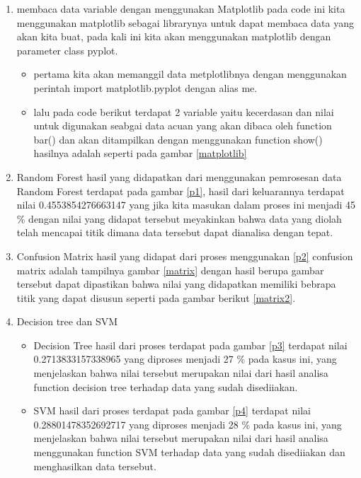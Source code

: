 \begin{enumerate}
\item membaca data variable dengan menggunakan Matplotlib 
\subitem 
pada code ini kita menggunakan matplotlib sebagai librarynya untuk dapat membaca data yang akan kita buat, pada kali ini kita akan menggunakan matplotlib dengan parameter class pyplot.
\begin{itemize}
\item pertama kita akan memanggil data metplotlibnya dengan menggunakan perintah import matplotlib.pyplot dengan alias me.
\item lalu pada code berikut terdapat 2 variable yaitu kecerdasan dan nilai untuk digunakan seabgai data acuan yang akan dibaca oleh function bar() dan akan ditampilkan dengan menggunakan function show() hasilnya adalah seperti pada gambar \ref{matplotlib}
\end{itemize}

\item Random Forest
\subitem
hasil yang didapatkan dari menggunakan pemrosesan data Random Forest terdapat pada gambar \ref{p1}, hasil dari keluarannya terdapat nilai 0.4553854276663147 yang jika kita masukan dalam proses ini menjadi 45 \% dengan nilai yang didapat tersebut meyakinkan bahwa data yang diolah telah mencapai titik dimana data tersebut dapat dianalisa dengan tepat.

\item Confusion Matrix
\subitem
hasil yang didapat dari proses menggunakan \ref{p2} confusion matrix adalah tampilnya gambar \ref{matrix} dengan hasil berupa gambar tersebut dapat dipastikan bahwa nilai yang didapatkan memiliki bebrapa titik yang dapat disusun seperti pada gambar berikut \ref{matrix2}.

\item Decision tree dan SVM
\begin{itemize}
\item Decision Tree
\subitem
hasil dari proses terdapat pada gambar \ref{p3} terdapat nilai 0.2713833157338965 yang diproses menjadi 27 \% pada kasus ini, yang menjelaskan bahwa nilai tersebut merupakan nilai dari hasil analisa function decision tree terhadap data yang sudah disediiakan.

\item SVM
\subitem
hasil dari proses terdapat pada gambar \ref{p4} terdapat nilai 0.28801478352692717 yang diproses menjadi 28 \% pada kasus ini, yang menjelaskan bahwa nilai tersebut merupakan nilai dari hasil analisa menggunakan function SVM terhadap data yang sudah disediiakan dan menghasilkan data tersebut.
\end{itemize}


\end{enumerate}
